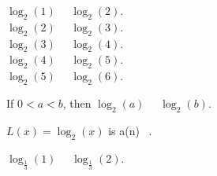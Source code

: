 \documentclass{ximera}
\author{Lee Wayand}
\begin{document}
\begin{example}


\begin{question}


$\log_2(1)$ \, \wordChoice{\choice[correct]{$<$} \choice{$>$}} \, $\log_2(2)$.  \\

$\log_2(2)$ \, \wordChoice{\choice[correct]{$<$} \choice{$>$}} \, $\log_2(3)$.  \\

$\log_2(3)$ \, \wordChoice{\choice[correct]{$<$} \choice{$>$}} \, $\log_2(4)$.  \\

$\log_2(4)$ \, \wordChoice{\choice[correct]{$<$} \choice{$>$}} \, $\log_2(5)$.  \\

$\log_2(5)$ \, \wordChoice{\choice[correct]{$<$} \choice{$>$}} \, $\log_2(6)$.  \\


\end{question}




\begin{question}



If $0 < a < b$, then $\log_2(a)$ \, \wordChoice{\choice[correct]{$<$} \choice{$>$}} \, $\log_2(b)$.  \\



\end{question}





\begin{question}



$L(x) = \log_2(x)$  is a(n) \,  .  \\



\end{question}














\begin{question}


$\log_{\tfrac{1}{3}}(1)$ \, \wordChoice{\choice{$<$} \choice[correct]{$>$}} \, $\log_{\tfrac{1}{3}}(2)$.  \\


\end{question}
\end{example}
\end{document}
